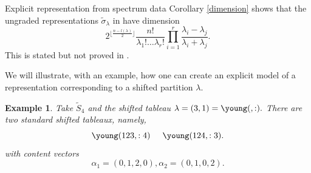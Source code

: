 \documentclass[a4paper,10pt]{amsart}
\newtheorem{example}[theorem]{Example}
\begin{document}
\begin{section}{Explicit representation from spectrum data}
Corollary \ref{dimension} shows that the ungraded representations $\tilde{\sigma}_\lambda$ in \cite{CH15} have dimension 
$$ 2^{\lfloor \frac{n-l(\lambda)}{2}\rfloor}  \frac{n!}{\lambda_1!\ldots \lambda_r!} \prod_{i=1}^{r} \frac{\lambda_i - \lambda_j}{\lambda_i +\lambda_j}.$$
This is stated but not proved in \cite[Example 6.9]{CH15}.


We will illustrate, with an example, how one can create an explicit model of a representation corresponding to a shifted partition $\lambda$.
\begin{example} 
 Take $\tilde{S}_4$ and the shifted tableau $\lambda = (3,1) = \young(\hfil \hfil \hfil ,:\hfil ).$ 
 There are two standard shifted tableaux, namely,
  $$\young(123,:4) \hspace{5mm} \young(124,:3) .$$
 with content vectors 
 $$\alpha_1 = (0,1,2,0), \alpha_2= (0,1,0,2).$$
 

\end{example}
\end{section}
\end{document}
